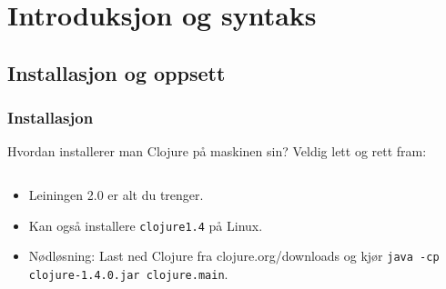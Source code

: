 \documentclass{beamer}
\begin{document}
\section{Introduksjon og syntaks}
\subsection{Installasjon og oppsett}
\begin{frame}
  \frametitle{Installasjon}

  Hvordan installerer man Clojure på maskinen sin? Veldig lett og rett
  fram:

  \begin{columns}
    \begin{column}{0.7\textwidth}
       \begin{itemize}
       \item<2-> Leiningen 2.0 er alt du trenger.
       \item<3-> Kan også installere {\tt clojure1.4} på Linux.
       \item<4-> Nødløsning: Last ned Clojure fra clojure.org/downloads og kjør
         \colorbox{solarbg}{\tt java -cp}
         \colorbox{solarbg}{\tt clojure-1.4.0.jar clojure.main}.
  \end{itemize}
    \end{column}
    \begin{column}{0.3\textwidth}

\end{column}
\end{columns}
\end{frame}
\end{document}
